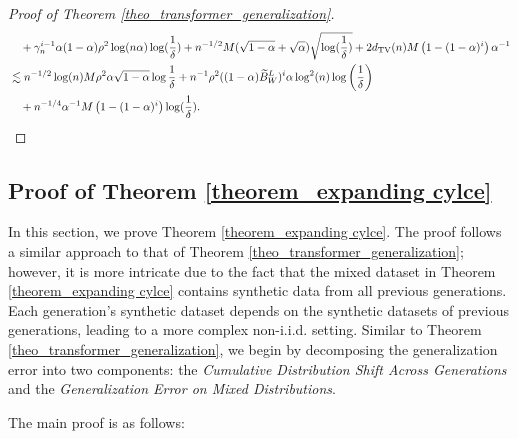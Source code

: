 \begin{proof}[Proof of Theorem \ref{theo_transformer_generalization}]
\begin{align}
&\quad +\gamma_n^{i-1}\alpha(1-\alpha)\rho^2 \log (n\alpha)\log (\frac{1}{\delta})+n^{-1/2}M(\sqrt{1-\alpha}+\sqrt{\alpha})\sqrt{\log (\frac{1}{\delta})}+2d_{\mathrm{TV}}(n) M\left(1-(1-\alpha)^i\right) \alpha^{-1}  \notag \\
&\lesssim n^{-1/2}\log (n) M\rho^2 \alpha \sqrt{1-\alpha}\log \frac{1}{\delta}+n^{-1}\rho^2((1-\alpha)\widetilde{B}_W^L)^i \alpha \log^2(n) \log \left(\frac{1}{\delta}\right) \notag \\
&\quad +n^{-1/4}\alpha^{-1} M\left(1-(1-\alpha)^i\right) \log (\frac{1}{\delta}).
\end{align}
 \end{proof}



















 \subsection{Proof of Theorem \ref{theorem_expanding cylce}}
 In this section, we prove Theorem \ref{theorem_expanding cylce}. The proof follows a similar approach to that of Theorem \ref{theo_transformer_generalization}; however, it is more intricate due to the fact that the mixed dataset in Theorem \ref{theorem_expanding cylce} contains synthetic data from all previous generations. Each generation's synthetic dataset depends on the synthetic datasets of previous generations, leading to a more complex non-i.i.d. setting. Similar to Theorem \ref{theo_transformer_generalization}, we begin by decomposing the generalization error into two components: the \textit{Cumulative Distribution Shift Across Generations} and the \textit{Generalization Error on Mixed Distributions}.
 
 The main proof is as follows:

